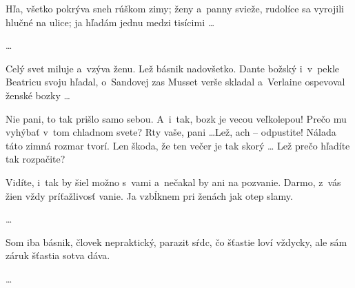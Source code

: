 Hľa, všetko pokrýva sneh rúškom zimy;
ženy a~panny svieže, rudolíce
sa vyrojili hlučné na ulice;
ja hľadám jednu medzi tisícimi \dots

\dots

Celý svet miluje a~vzýva ženu.
Lež básnik nadovšetko. Dante božský
i~v~pekle Beatricu svoju hľadal,
o~Sandovej zas Musset verše skladal
a~Verlaine ospevoval ženské bozky \dots


Nie pani, to tak prišlo samo sebou.
A~i~tak, bozk je vecou veľkolepou!
Prečo mu vyhýbať v~tom chladnom svete?
Rty vaše, pani \dots Lež, ach -- odpustite!
Nálada táto zimná rozmar tvorí.
Len škoda, že ten večer je tak skorý \dots
Lež prečo hľadíte tak rozpačite?


Vidíte, i~tak by šiel možno s~vami
a~nečakal by ani na pozvanie.
Darmo, z~vás žien vždy príťažlivosť vanie.
Ja vzbĺknem pri ženách jak otep slamy.

\dots

Som iba básnik, človek nepraktický,
parazit sŕdc, čo šťastie loví vždycky,
ale sám záruk šťastia sotva dáva.

\dots
